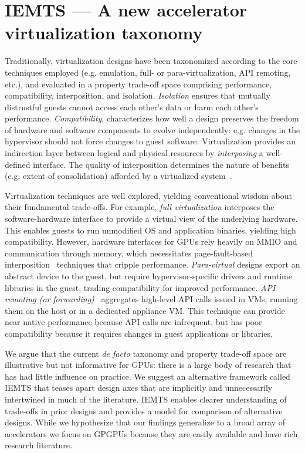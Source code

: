 \section{IEMTS --- A new accelerator virtualization taxonomy}
\label{sec:iemts}

Traditionally, virtualization designs have been taxonomized
according to the core techniques employed (e.g. emulation, full- or para-virtualization,
API remoting, etc.), and evaluated
in a property trade-off space comprising performance,
compatibility, interposition, and isolation. \emph{Isolation} ensures that mutually distrustful
guests cannot access each other's data or harm each other's performance. \emph{Compatibility},
characterizes how well a design preserves the freedom of
hardware and software components to evolve independently: e.g. changes in the hypervisor
should not force changes to guest software.
Virtualization provides an indirection layer between
logical and physical resources by \emph{interposing} a well-defined
interface. The quality of
interposition determines the nature of benefits (e.g. extent of consolidation) afforded by a
virtualized system~\cite{waldspurger12cacm}.

Virtualization techniques are well explored, yielding conventional
wisdom about their fundamental trade-offs. For example,
\emph{full virtualization} interposes the software-hardware interface
to provide a virtual view of the
underlying hardware. This enables guests to run unmodified OS and
application binaries, yielding high compatibility. However, hardware interfaces
for GPUs rely heavily on MMIO and communication through memory, which
necessitates page-fault-based interposition~\cite{tian2014full,
intel_kvmgt,kindratenko2009gpu,montella2012general} techniques that cripple
performance.
\emph{Para-virtual} designs export an abstract device to the guest,
but require hypervisor-specific drivers and runtime libraries in the
guest, trading compatibility for improved performance.
\emph{API remoting (or forwarding)}~\cite{gupta2009gvim, dowty2009gpu,
giunta2010gpgpu, shi2012vcuda} aggregates high-level API calls
issued in VMs, running them on the host or in a dedicated appliance VM.
This technique can provide near native performance because API calls
are infrequent, but has poor compatibility because it requires
changes in guest applications or libraries.

We argue that the current \emph{de facto} taxonomy and property trade-off space
are illustrative but not informative for GPUs:
there is a large body of research that has had little influence on practice.
We suggest an alternative framework called \textsc{IEMTS} that teases apart design
axes that are implicitly and unnecessarily intertwined in much of the literature.
\textsc{IEMTS} enables clearer understanding of trade-offs in prior designs
and provides a model for comparison of alternative designs.
While we hypothesize that our findings generalize to a broad array of accelerators
we focus on GPGPUs because they are easily available and have rich research literature.

